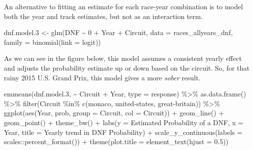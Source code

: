 \documentclass[
]{book}
\newenvironment{Shaded}{\begin{snugshade}}{\end{snugshade}}
\newcommand{\AttributeTok}[1]{\textcolor[rgb]{0.77,0.63,0.00}{#1}}
\newcommand{\DecValTok}[1]{\textcolor[rgb]{0.00,0.00,0.81}{#1}}
\newcommand{\FloatTok}[1]{\textcolor[rgb]{0.00,0.00,0.81}{#1}}
\newcommand{\FunctionTok}[1]{\textcolor[rgb]{0.00,0.00,0.00}{#1}}
\newcommand{\NormalTok}[1]{#1}
\newcommand{\OtherTok}[1]{\textcolor[rgb]{0.56,0.35,0.01}{#1}}
\newcommand{\SpecialCharTok}[1]{\textcolor[rgb]{0.00,0.00,0.00}{#1}}
\newcommand{\StringTok}[1]{\textcolor[rgb]{0.31,0.60,0.02}{#1}}
\begin{document}
An alternative to fitting an estimate for each race-year combination is to model both the year and track estimates, but not as an interaction term.

\begin{Shaded}
\begin{Highlighting}[]
\NormalTok{dnf.model}\FloatTok{.3} \OtherTok{\textless{}{-}} \FunctionTok{glm}\NormalTok{(DNF }\SpecialCharTok{\textasciitilde{}} \DecValTok{0} \SpecialCharTok{+}\NormalTok{ Year }\SpecialCharTok{+}\NormalTok{ Circuit, }\AttributeTok{data =}\NormalTok{ races\_allyears\_dnf,}
                   \AttributeTok{family =} \FunctionTok{binomial}\NormalTok{(}\AttributeTok{link =} \StringTok{\textquotesingle{}logit\textquotesingle{}}\NormalTok{))}
\end{Highlighting}
\end{Shaded}

As we can see in the figure below, this model assumes a consistent yearly effect and adjusts the probability estimate up or down based on the circuit. So, for that rainy 2015 U.S. Grand Prix, this model gives a more \emph{sober} result.

\begin{Shaded}
\begin{Highlighting}[]
\FunctionTok{emmeans}\NormalTok{(dnf.model}\FloatTok{.3}\NormalTok{, }\SpecialCharTok{\textasciitilde{}}\NormalTok{ Circuit }\SpecialCharTok{+}\NormalTok{ Year, }\AttributeTok{type =} \StringTok{\textquotesingle{}response\textquotesingle{}}\NormalTok{) }\SpecialCharTok{\%\textgreater{}\%} 
  \FunctionTok{as.data.frame}\NormalTok{() }\SpecialCharTok{\%\textgreater{}\%} 
  \FunctionTok{filter}\NormalTok{(Circuit }\SpecialCharTok{\%in\%} \FunctionTok{c}\NormalTok{(}\StringTok{\textquotesingle{}monaco\textquotesingle{}}\NormalTok{, }\StringTok{\textquotesingle{}united{-}states\textquotesingle{}}\NormalTok{, }\StringTok{\textquotesingle{}great{-}britain\textquotesingle{}}\NormalTok{)) }\SpecialCharTok{\%\textgreater{}\%} 
  \FunctionTok{ggplot}\NormalTok{(}\FunctionTok{aes}\NormalTok{(Year, prob, }\AttributeTok{group =}\NormalTok{ Circuit, }\AttributeTok{col =}\NormalTok{ Circuit)) }\SpecialCharTok{+}
  \FunctionTok{geom\_line}\NormalTok{() }\SpecialCharTok{+}
  \FunctionTok{geom\_point}\NormalTok{() }\SpecialCharTok{+} 
  \FunctionTok{theme\_bw}\NormalTok{() }\SpecialCharTok{+}
  \FunctionTok{labs}\NormalTok{(}\AttributeTok{y =} \StringTok{\textquotesingle{}Estimated Probability of a DNF\textquotesingle{}}\NormalTok{,}
       \AttributeTok{x =} \StringTok{\textquotesingle{}Year\textquotesingle{}}\NormalTok{,}
       \AttributeTok{title =} \StringTok{\textquotesingle{}Yearly trend in DNF Probability\textquotesingle{}}\NormalTok{) }\SpecialCharTok{+}
\FunctionTok{scale\_y\_continuous}\NormalTok{(}\AttributeTok{labels =}\NormalTok{ scales}\SpecialCharTok{::}\FunctionTok{percent\_format}\NormalTok{()) }\SpecialCharTok{+}
  \FunctionTok{theme}\NormalTok{(}\AttributeTok{plot.title =} \FunctionTok{element\_text}\NormalTok{(}\AttributeTok{hjust =} \FloatTok{0.5}\NormalTok{))}
\end{Highlighting}
\end{Shaded}
\end{document}
